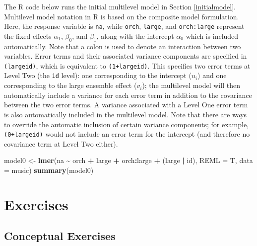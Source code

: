 \documentclass[
]{krantz}
\newenvironment{Shaded}{\begin{snugshade}}{\end{snugshade}}
\newcommand{\AttributeTok}[1]{\textcolor[rgb]{0.27,0.27,0.27}{#1}}
\newcommand{\FunctionTok}[1]{\textcolor[rgb]{0.27,0.27,0.27}{\textbf{#1}}}
\newcommand{\NormalTok}[1]{#1}
\newcommand{\OtherTok}[1]{\textcolor[rgb]{0.37,0.37,0.37}{#1}}
\newcommand{\SpecialCharTok}[1]{\textcolor[rgb]{0.43,0.43,0.43}{\textbf{#1}}}
\begin{document}
The R code below runs the initial multilevel model  in Section \ref{initialmodel}. Multilevel model notation in R is based on the composite model formulation. Here, the response variable is \texttt{na}, while \texttt{orch}, \texttt{large}, and \texttt{orch:large} represent the fixed effects \(\alpha_{1}\), \(\beta_{0}\), and \(\beta_{1}\), along with the intercept \(\alpha_{0}\) which is included automatically. Note that a colon is used to denote an interaction between two variables. Error terms and their associated variance components are specified in \texttt{(large\textbar{}id)}, which is equivalent to \texttt{(1+large\textbar{}id)}. This specifies two error terms at Level Two (the \texttt{id} level): one corresponding to the intercept (\(u_{i}\)) and one corresponding to the large ensemble effect (\(v_{i}\)); the multilevel model will then automatically include a variance for each error term in addition to the covariance between the two error terms. A variance associated with a Level One error term is also automatically included in the multilevel model. Note that there are ways to override the automatic inclusion of certain variance components; for example, \texttt{(0+large\textbar{}id)} would not include an error term for the intercept (and therefore no covariance term at Level Two either).

\begin{Shaded}
\begin{Highlighting}[]
\NormalTok{model0 }\OtherTok{\textless{}{-}} \FunctionTok{lmer}\NormalTok{(na }\SpecialCharTok{\textasciitilde{}}\NormalTok{ orch }\SpecialCharTok{+}\NormalTok{ large }\SpecialCharTok{+}\NormalTok{ orch}\SpecialCharTok{:}\NormalTok{large }\SpecialCharTok{+}
\NormalTok{  (large }\SpecialCharTok{|}\NormalTok{ id), }\AttributeTok{REML =}\NormalTok{ T, }\AttributeTok{data =}\NormalTok{ music)}
\FunctionTok{summary}\NormalTok{(model0)}
\end{Highlighting}
\end{Shaded}

\section{Exercises}\label{exercises-7}

\subsection{Conceptual Exercises}\label{conceptual-exercises-5}
\end{document}
